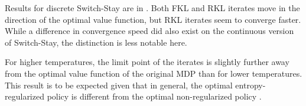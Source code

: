 \documentclass[\main/thesis.tex]{subfiles}
\begin{document}
Results for discrete Switch-Stay are in . Both FKL and RKL iterates move in the direction of the optimal value function, but RKL iterates seem to converge faster. While a difference in convergence speed did also exist on the continuous version of Switch-Stay, the distinction is less notable here. 

For higher temperatures, the limit point of the iterates is slightly further away from the optimal value function of the original MDP than for lower temperatures. This result is to be expected given that in general, the optimal entropy-regularized policy is different from the optimal non-regularized policy \citep{geist2019theory}.


  
  
\end{document}
